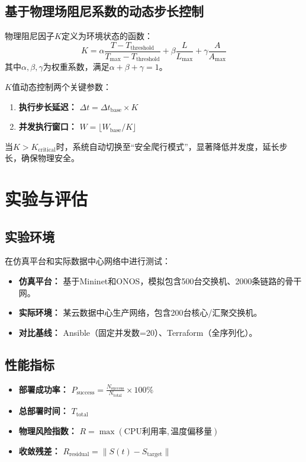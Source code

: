 \documentclass[12pt,a4paper]{article}
\begin{document}
\subsection{基于物理场阻尼系数的动态步长控制}
\label{subsec:damping}

物理阻尼因子$K$定义为环境状态的函数：
\begin{equation}
    K = \alpha \frac{T - T_{\text{threshold}}}{T_{\text{max}} - T_{\text{threshold}}} + \beta \frac{L}{L_{\text{max}}} + \gamma \frac{A}{A_{\text{max}}}
    \label{eq:damping_factor}
\end{equation}
其中$\alpha, \beta, \gamma$为权重系数，满足$\alpha + \beta + \gamma = 1$。

$K$值动态控制两个关键参数：
\begin{enumerate}
    \item \textbf{执行步长延迟：} $\Delta t = \Delta t_{\text{base}} \times K$
    \item \textbf{并发执行窗口：} $W = \lfloor W_{\text{base}} / K \rfloor$
\end{enumerate}

当$K > K_{\text{critical}}$时，系统自动切换至“安全爬行模式”，显著降低并发度，延长步长，确保物理安全。

\section{实验与评估}
\label{sec:experiment}

\subsection{实验环境}
在仿真平台和实际数据中心网络中进行测试：
\begin{itemize}
    \item \textbf{仿真平台：} 基于Mininet和ONOS，模拟包含500台交换机、2000条链路的骨干网。
    \item \textbf{实际环境：} 某云数据中心生产网络，包含200台核心/汇聚交换机。
    \item \textbf{对比基线：} Ansible（固定并发数=20）、Terraform（全序列化）。
\end{itemize}

\subsection{性能指标}
\begin{itemize}
    \item \textbf{部署成功率：} $P_{\text{success}} = \frac{N_{\text{success}}}{N_{\text{total}}} \times 100\%$
    \item \textbf{总部署时间：} $T_{\text{total}}$
    \item \textbf{物理风险指数：} $R = \max(\text{CPU利用率}, \text{温度偏移量})$
    \item \textbf{收敛残差：} $R_{\text{residual}} = \|S(t) - S_{\text{target}}\|$
\end{itemize}
\end{document}
